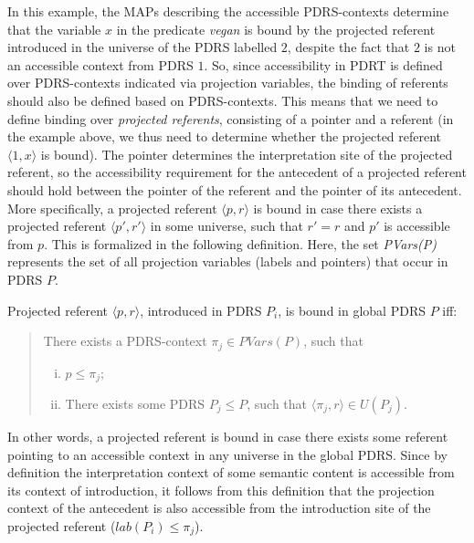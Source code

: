 In this example, the MAPs describing the accessible PDRS-contexts determine
that the variable $x$ in the predicate \textit{vegan} is bound by the
projected referent introduced in the universe of the PDRS labelled $2$,
despite the fact that $2$ is not an accessible context from PDRS $1$.  So,
since accessibility in PDRT is defined over PDRS-contexts indicated via
projection variables, the binding of referents should also be defined based
on PDRS-contexts. This means that we need to define binding over
\textit{projected referents}, consisting of a pointer and a referent (in the
example above, we thus need to determine whether the projected referent
$\langle 1, x\rangle$ is bound). The pointer determines the interpretation
site of the projected referent, so the accessibility requirement for the
antecedent of a projected referent should hold between the pointer of the
referent and the pointer of its antecedent.  More specifically, a projected
referent $\langle p, r \rangle$ is bound in case there exists a projected
referent $\langle p',r'\rangle$ in some universe, such that $r'=r$ and $p'$
is accessible from $p$.  This is formalized in the following definition.
Here, the set \textit{PVars(P)} represents the set of all projection
variables (labels and pointers) that occur in PDRS $P$.

\begin{definition}
Projected referent $\langle p,r\rangle$, introduced in PDRS $P_i$, is bound
in global PDRS $P$ iff:
\begin{quote}
There exists a PDRS-context $\pi_j \in PVars(P)$, such that
\begin{enumerate}[i.]
  \item $p \leq \pi_j$; 
  \item There exists some PDRS $P_j \leq P$, such that 
    $\langle \pi_j,r\rangle \in U(P_j)$.
\end{enumerate}
\end{quote}
\end{definition}

\noindent In other words, a projected referent is bound in case there exists
some referent pointing to an accessible context in any universe in the
global PDRS.  Since by definition the interpretation context of some
semantic content is accessible from its context of introduction, it follows
from this definition that the projection context of the antecedent is also
accessible from the introduction site of the projected referent ($lab(P_i)
\leq \pi_j$). 

